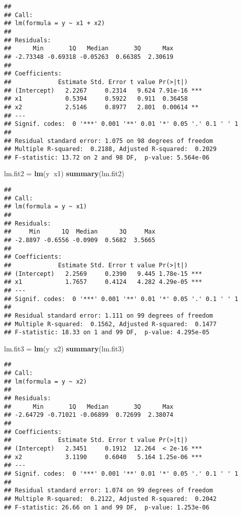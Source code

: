 \documentclass[]{article}
\newenvironment{Shaded}{\begin{snugshade}}{\end{snugshade}}
\newcommand{\KeywordTok}[1]{\textcolor[rgb]{0.13,0.29,0.53}{\textbf{#1}}}
\newcommand{\NormalTok}[1]{#1}
\newcommand{\OperatorTok}[1]{\textcolor[rgb]{0.81,0.36,0.00}{\textbf{#1}}}
\newcommand{\StringTok}[1]{\textcolor[rgb]{0.31,0.60,0.02}{#1}}
\begin{document}
\begin{verbatim}
## 
## Call:
## lm(formula = y ~ x1 + x2)
## 
## Residuals:
##      Min       1Q   Median       3Q      Max 
## -2.73348 -0.69318 -0.05263  0.66385  2.30619 
## 
## Coefficients:
##             Estimate Std. Error t value Pr(>|t|)    
## (Intercept)   2.2267     0.2314   9.624 7.91e-16 ***
## x1            0.5394     0.5922   0.911  0.36458    
## x2            2.5146     0.8977   2.801  0.00614 ** 
## ---
## Signif. codes:  0 '***' 0.001 '**' 0.01 '*' 0.05 '.' 0.1 ' ' 1
## 
## Residual standard error: 1.075 on 98 degrees of freedom
## Multiple R-squared:  0.2188, Adjusted R-squared:  0.2029 
## F-statistic: 13.72 on 2 and 98 DF,  p-value: 5.564e-06
\end{verbatim}

\begin{Shaded}
\begin{Highlighting}[]
\NormalTok{lm.fit2 =}\StringTok{ }\KeywordTok{lm}\NormalTok{(y}\OperatorTok{~}\NormalTok{x1)}
\KeywordTok{summary}\NormalTok{(lm.fit2)}
\end{Highlighting}
\end{Shaded}

\begin{verbatim}
## 
## Call:
## lm(formula = y ~ x1)
## 
## Residuals:
##     Min      1Q  Median      3Q     Max 
## -2.8897 -0.6556 -0.0909  0.5682  3.5665 
## 
## Coefficients:
##             Estimate Std. Error t value Pr(>|t|)    
## (Intercept)   2.2569     0.2390   9.445 1.78e-15 ***
## x1            1.7657     0.4124   4.282 4.29e-05 ***
## ---
## Signif. codes:  0 '***' 0.001 '**' 0.01 '*' 0.05 '.' 0.1 ' ' 1
## 
## Residual standard error: 1.111 on 99 degrees of freedom
## Multiple R-squared:  0.1562, Adjusted R-squared:  0.1477 
## F-statistic: 18.33 on 1 and 99 DF,  p-value: 4.295e-05
\end{verbatim}

\begin{Shaded}
\begin{Highlighting}[]
\NormalTok{lm.fit3 =}\StringTok{ }\KeywordTok{lm}\NormalTok{(y}\OperatorTok{~}\NormalTok{x2)}
\KeywordTok{summary}\NormalTok{(lm.fit3)}
\end{Highlighting}
\end{Shaded}

\begin{verbatim}
## 
## Call:
## lm(formula = y ~ x2)
## 
## Residuals:
##      Min       1Q   Median       3Q      Max 
## -2.64729 -0.71021 -0.06899  0.72699  2.38074 
## 
## Coefficients:
##             Estimate Std. Error t value Pr(>|t|)    
## (Intercept)   2.3451     0.1912  12.264  < 2e-16 ***
## x2            3.1190     0.6040   5.164 1.25e-06 ***
## ---
## Signif. codes:  0 '***' 0.001 '**' 0.01 '*' 0.05 '.' 0.1 ' ' 1
## 
## Residual standard error: 1.074 on 99 degrees of freedom
## Multiple R-squared:  0.2122, Adjusted R-squared:  0.2042 
## F-statistic: 26.66 on 1 and 99 DF,  p-value: 1.253e-06
\end{verbatim}
\end{document}
